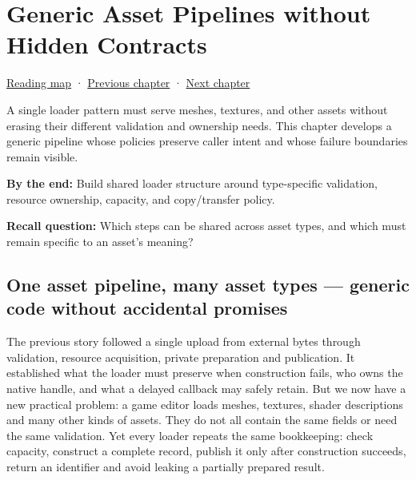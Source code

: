 \chapter{Generic Asset Pipelines without Hidden Contracts}\label{01-foundations-i-ch005-generic-asset-pipelines-without-hidden-contracts}\hypertarget{01-foundations-i-ch005}{}\label{stagechapter:01-foundations-i-ch005}

\hypertarget{01-foundations-i-ch005-generic-asset-pipelines-without-hidden-contracts}{}

\hyperref[volume-reading-map]{Reading map} · \hyperref[01-foundations-i-ch004-prove-c-ownership-with-runnable-experiments]{Previous chapter} · \hyperref[01-foundations-i-ch006-grow-registries-without-invalidating-identity]{Next chapter}

A single loader pattern must serve meshes, textures, and other assets without erasing their different validation and ownership needs. This chapter develops a generic pipeline whose policies preserve caller intent and whose failure boundaries remain visible.

\textbf{By the end:} Build shared loader structure around type-specific validation, resource ownership, capacity, and copy/transfer policy.

\textbf{Recall question:} Which steps can be shared across asset types, and which must remain specific to an asset's meaning?

\section{One asset pipeline, many asset types --- generic code without accidental promises}\label{01-foundations-i-ch005-one-asset-pipeline-many-asset-types-generic-code-without-accidental-promises}

\hypertarget{01-foundations-i-ch005-one-asset-pipeline-many-asset-types-generic-code-without-accidental-promises}{}

The previous story followed a single upload from external bytes through validation, resource acquisition, private preparation and publication. It established what the loader must preserve when construction fails, who owns the native handle, and what a delayed callback may safely retain. But we now have a new practical problem: a game editor loads meshes, textures, shader descriptions and many other kinds of assets. They do not all contain the same fields or need the same validation. Yet every loader repeats the same bookkeeping: check capacity, construct a complete record, publish it only after construction succeeds, return an identifier and avoid leaking a partially prepared result.

